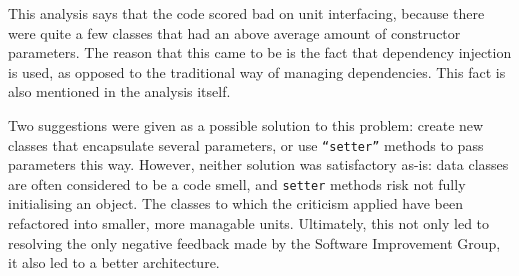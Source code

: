 This analysis says that the code scored bad on unit interfacing, because there
were quite a few classes that had an above average amount of constructor
parameters. The reason that this came to be is the fact that dependency
injection is used, as opposed to the traditional way of managing dependencies.
This fact is also mentioned in the analysis itself.

Two suggestions were given as a possible solution to this problem: create new
classes that encapsulate several parameters, or use \texttt{``setter''} methods
to pass parameters this way. However, neither solution was satisfactory as-is:
data classes are often considered to be a code smell, and \texttt{setter}
methods risk not fully initialising an object. The classes to which the
criticism applied have been refactored into smaller, more managable units.
Ultimately, this not only led to resolving the only negative feedback made by
the Software Improvement Group, it also led to a better architecture.

